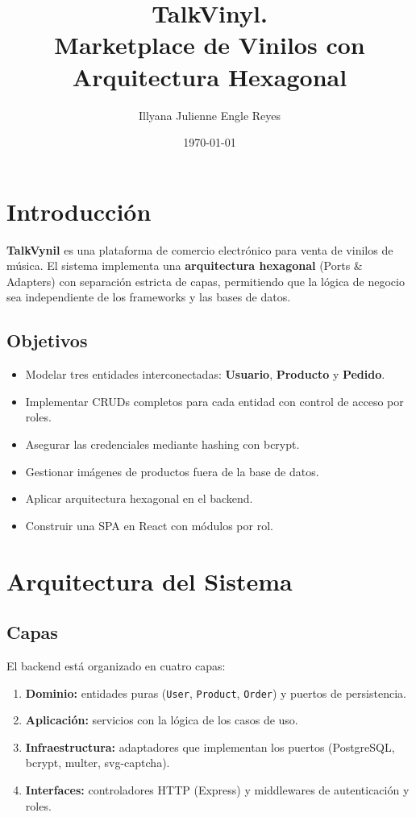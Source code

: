 \documentclass[11pt,letterpaper]{article}
\title{\Huge \textbf{TalkVinyl.} \\ \Large Marketplace de Vinilos con Arquitectura Hexagonal}
\author{Illyana Julienne Engle Reyes}
\date{\today}
\begin{document}
\maketitle

\tableofcontents
\newpage

\section{Introducción}

\textbf{TalkVynil} es una plataforma de comercio electrónico para venta de vinilos de música. El sistema implementa una \textbf{arquitectura hexagonal} (Ports \& Adapters) con separación estricta de capas, permitiendo que la lógica de negocio sea independiente de los frameworks y las bases de datos.

\subsection{Objetivos}

\begin{itemize}
  \item Modelar tres entidades interconectadas: \textbf{Usuario}, \textbf{Producto} y \textbf{Pedido}.
  \item Implementar CRUDs completos para cada entidad con control de acceso por roles.
  \item Asegurar las credenciales mediante hashing con bcrypt.
  \item Gestionar imágenes de productos fuera de la base de datos.
  \item Aplicar arquitectura hexagonal en el backend.
  \item Construir una SPA en React con módulos por rol.
\end{itemize}

\section{Arquitectura del Sistema}

\subsection{Capas}

El backend está organizado en cuatro capas:

\begin{enumerate}
  \item \textbf{Dominio:} entidades puras (\texttt{User}, \texttt{Product}, \texttt{Order}) y puertos de persistencia.
  \item \textbf{Aplicación:} servicios con la lógica de los casos de uso.
  \item \textbf{Infraestructura:} adaptadores que implementan los puertos (PostgreSQL, bcrypt, multer, svg-captcha).
  \item \textbf{Interfaces:} controladores HTTP (Express) y middlewares de autenticación y roles.
\end{enumerate}
\end{document}
